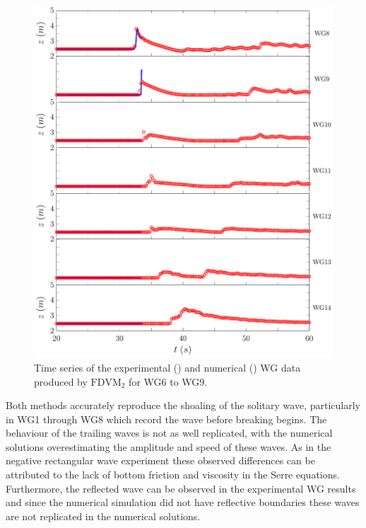 \begin{figure}
	\centering
	\includegraphics[width=\textwidth]{./chp6/figures/Experiment/Roeber/Trial8/FDVM/LongWGs2.pdf}
	\caption{Time series of the experimental () and numerical ({\color{blue}\solidrule}) WG data produced by $\text{FDVM}_2$ for WG6 to WG9.}
	\label{fig:Roeber8WG6to9FDVM}
\end{figure} 

Both methods accurately reproduce the shoaling of the solitary wave, particularly in WG1 through WG8 which record the wave before breaking begins. The behaviour of the trailing waves is not as well replicated, with the numerical solutions overestimating the amplitude and speed of these waves. As in the negative rectangular wave experiment these observed differences can be attributed to the lack of bottom friction and viscosity in the Serre equations. Furthermore, the reflected wave can be observed in the experimental WG results and since the numerical simulation did not have reflective boundaries these waves are not replicated in the numerical solutions.

